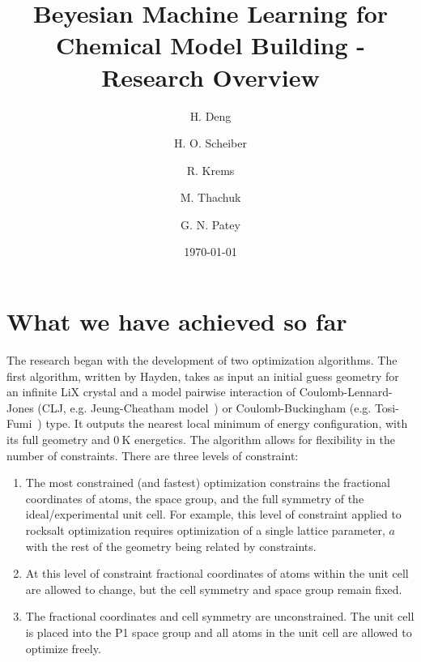 \documentclass[aip,preprint,amsmath,amssymb,hidelinks]{revtex4-1}
\begin{document}
\date{\today}

	\author{H. Deng}
	\author{H. O. Scheiber}
	\author{R. Krems}
	\author{M. Thachuk}
	\author{G. N. Patey}
	
	\title{Beyesian Machine Learning for Chemical Model Building - Research Overview}
	
	\newcommand{\kJmol}{kJ mol$^{-1}$}
	\newcommand{\boldr}{{\bm r}}
	

	\maketitle
	
	\section{What we have achieved so far}
	
	The research began with the development of two optimization algorithms. 
	The first algorithm, written by Hayden, takes as input an initial guess geometry for an infinite LiX crystal and a model pairwise interaction of Coulomb-Lennard-Jones (CLJ, e.g. Jeung-Cheatham model~\cite{Joung2008}) or Coulomb-Buckingham (e.g. Tosi-Fumi~\cite{Tosi1964,Fumi1964}) type. It outputs the nearest local minimum of energy configuration, with its full geometry and $\SI{0}{\kelvin}$ energetics.
	The algorithm allows for flexibility in the number of constraints. There are three levels of constraint:
	\begin{enumerate}
		\item The most constrained (and fastest) optimization constrains the fractional coordinates of atoms, the space group, and the full symmetry of the ideal/experimental unit cell. For example, this level of constraint applied to rocksalt optimization requires optimization of a single lattice parameter, $a$ with the rest of the geometry being related by constraints.
		\item At this level of constraint fractional coordinates of atoms within the unit cell are allowed to change, but the cell symmetry and space group remain fixed.
		\item The fractional coordinates and cell symmetry are unconstrained. The unit cell is placed into the P1 space group and all atoms in the unit cell are allowed to optimize freely.
	\end{enumerate}
	
\end{document}

